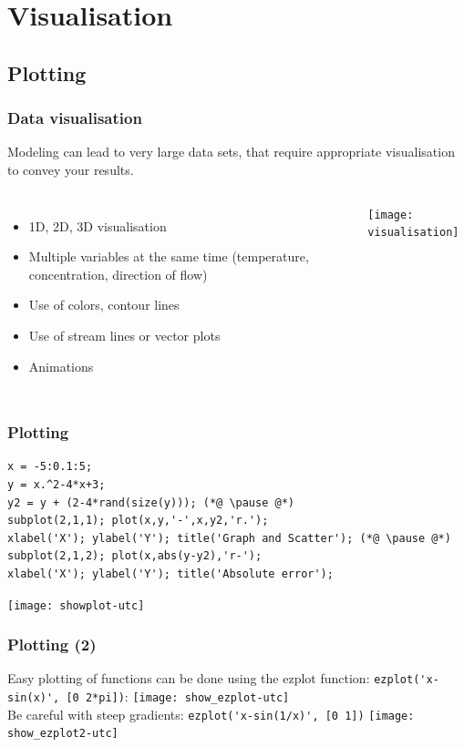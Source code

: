 \documentclass[11pt,table,final,fleqn,xcolor={usenames,dvipsnames},unknownkeysallowed,handout]{beamer}
\begin{document}
\section{Visualisation}
\subsection*{Plotting}
\begin{frame}
 \frametitle{Data visualisation}
 Modeling can lead to very large data sets, that require appropriate visualisation to convey your results.
 \begin{columns}
    \begin{itemize}
      \item 1D, 2D, 3D visualisation
      \item Multiple variables at the same time (temperature, concentration, direction of flow)
      \item Use of colors, contour lines
      \item Use of stream lines or vector plots
      \item Animations
    \end{itemize}
   \centering\texttt{[image: visualisation]}
 \end{columns}
\end{frame}

\begin{frame}[fragile]
  \frametitle{Plotting}
  \begin{lstlisting}
x = -5:0.1:5;
y = x.^2-4*x+3;
y2 = y + (2-4*rand(size(y))); (*@ \pause @*)
subplot(2,1,1); plot(x,y,'-',x,y2,'r.');
xlabel('X'); ylabel('Y'); title('Graph and Scatter'); (*@ \pause @*)
subplot(2,1,2); plot(x,abs(y-y2),'r-');
xlabel('X'); ylabel('Y'); title('Absolute error');
  \end{lstlisting}
  \centering\texttt{[image: showplot-utc]}
\end{frame}

\begin{frame}[fragile]
  \frametitle{Plotting (2)}
  Easy plotting of functions can be done using the ezplot function: \lstinline$ezplot('x-sin(x)', [0 2*pi])$:
  \texttt{[image: show\_ezplot-utc]}\\
  Be careful with steep gradients: \lstinline$ezplot('x-sin(1/x)', [0 1])$%
  \texttt{[image: show\_ezplot2-utc]}
\end{frame}
\end{document}
